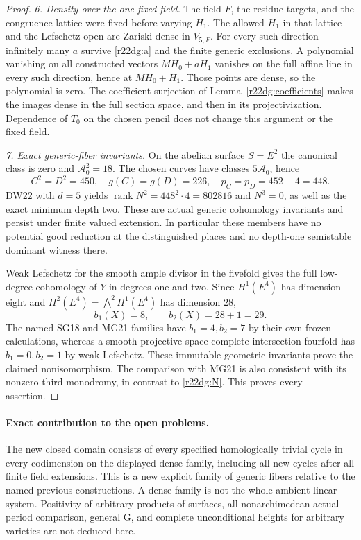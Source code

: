 \begin{proof}
\emph{6. Density over the one fixed field.}
The field $F$, the residue targets, and the congruence lattice
were fixed before varying $H_1$.  The allowed $H_1$ in that
lattice and the Lefschetz open are Zariski dense in $V_{5,F}$.
For every such direction infinitely many $a$ survive
\eqref{r22dg:a} and the finite generic exclusions.  A polynomial
vanishing on all constructed vectors $MH_0+aH_1$ vanishes on
the full affine line in every such direction, hence at
$MH_0+H_1$.  Those points are dense, so the polynomial is zero.
The coefficient surjection of Lemma~\ref{r22dg:coefficients}
makes the images dense in the full section space, and then in
its projectivization.  Dependence of $T_0$ on the chosen pencil
does not change this argument or the fixed field.

\emph{7. Exact generic-fiber invariants.}
On the abelian surface $S=E^2$ the canonical class is zero and
$\mathcal A_0^2=18$.  The chosen curves have classes
$5\mathcal A_0$, hence
\[
                 C^2=D^2=450,\quad g(C)=g(D)=226,\quad
                 p_C=p_D=452-4=448.
 \tag{DG22.12}\label{r22dg:genus}
\]
DW22 with $d=5$ yields
$\operatorname{rank}N^2=448^2\cdot4=802816$ and $N^3=0$,
as well as the exact minimum depth two.  These are actual
generic cohomology invariants and persist under finite valued
extension.  In particular these members have no potential good
reduction at the distinguished places and no depth-one
semistable dominant witness there.

Weak Lefschetz for the smooth ample divisor in the fivefold
gives the full low-degree cohomology of $Y$ in degrees one
and two.  Since $H^1(E^4)$ has dimension eight and
$H^2(E^4)=\bigwedge^2H^1(E^4)$ has dimension $28$,
\[
                         b_1(X)=8,\qquad b_2(X)=28+1=29.
 \tag{DG22.13}\label{r22dg:Betti}
\]
The named SG18 and MG21 families have $b_1=4,b_2=7$ by their
own frozen calculations, whereas a smooth projective-space
complete-intersection fourfold has $b_1=0,b_2=1$ by weak
Lefschetz.  These immutable geometric invariants prove the
claimed nonisomorphism.  The comparison with MG21 is also
consistent with its nonzero third monodromy, in contrast to
\eqref{r22dg:N}.  This proves every assertion.
\end{proof}

\paragraph{Exact contribution to the open problems.}
The new closed domain consists of every specified homologically
trivial cycle in every codimension on the displayed dense family,
including all new cycles after all finite field extensions.
This is a new explicit family of generic fibers relative to the
named previous constructions.  A dense family is not the whole
ambient linear system.  Positivity of arbitrary products of
surfaces, all nonarchimedean actual period comparison, general G,
and complete unconditional heights for arbitrary varieties are
not deduced here.

